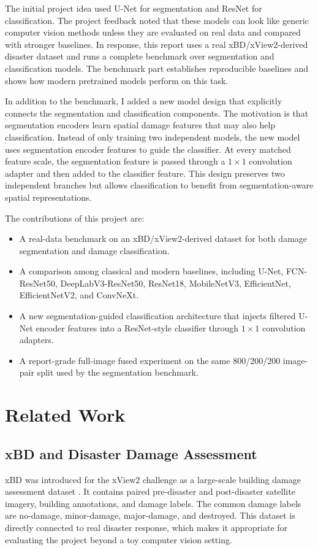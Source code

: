 \documentclass[10pt,conference]{IEEEtran}
\begin{document}
The initial project idea used U-Net for segmentation and ResNet for classification. The project feedback noted that these models can look like generic computer vision methods unless they are evaluated on real data and compared with stronger baselines. In response, this report uses a real xBD/xView2-derived disaster dataset and runs a complete benchmark over segmentation and classification models. The benchmark part establishes reproducible baselines and shows how modern pretrained models perform on this task.

In addition to the benchmark, I added a new model design that explicitly connects the segmentation and classification components. The motivation is that segmentation encoders learn spatial damage features that may also help classification. Instead of only training two independent models, the new model uses segmentation encoder features to guide the classifier. At every matched feature scale, the segmentation feature is passed through a $1\times1$ convolution adapter and then added to the classifier feature. This design preserves two independent branches but allows classification to benefit from segmentation-aware spatial representations.

The contributions of this project are:
\begin{itemize}
    \item A real-data benchmark on an xBD/xView2-derived dataset for both damage segmentation and damage classification.
    \item A comparison among classical and modern baselines, including U-Net, FCN-ResNet50, DeepLabV3-ResNet50, ResNet18, MobileNetV3, EfficientNet, EfficientNetV2, and ConvNeXt.
    \item A new segmentation-guided classification architecture that injects filtered U-Net encoder features into a ResNet-style classifier through $1\times1$ convolution adapters.
    \item A report-grade full-image fused experiment on the same 800/200/200 image-pair split used by the segmentation benchmark.
\end{itemize}

\section{Related Work}
\subsection{xBD and Disaster Damage Assessment}
xBD was introduced for the xView2 challenge as a large-scale building damage assessment dataset \cite{gupta2019xbd}. It contains paired pre-disaster and post-disaster satellite imagery, building annotations, and damage labels. The common damage labels are no-damage, minor-damage, major-damage, and destroyed. This dataset is directly connected to real disaster response, which makes it appropriate for evaluating the project beyond a toy computer vision setting.
\end{document}
